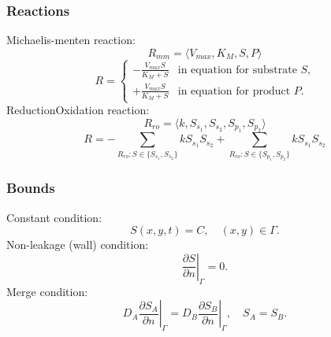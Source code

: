 \documentclass[a4paper,10pt]{article}
\begin{document}
\subsubsection{Reactions}

Michaelis-menten reaction:
\begin{equation}
    R_{mm} = \langle V_{max}, K_M, S, P \rangle
\end{equation}
\begin{equation}
    R = \begin{cases}
            -\frac{V_{max} S}{K_M + S} & \text{in equation for substrate $S$,}
            \\
            +\frac{V_{max} S}{K_M + S} & \text{in equation for product $P$.}
        \end{cases}
\end{equation}
%
ReductionOxidation reaction:
\begin{equation}
    R_{ro} = \langle k, S_{s_1}, S_{s_2}, S_{p_1}, S_{p_2} \rangle
\end{equation}
\begin{equation}
    R =
        - \sum_{R_{ro} : S \in \{S_{s_1}, S_{s_2}\}} k S_{s_1} S_{s_2}
        + \sum_{R_{ro} : S \in \{S_{p_1}, S_{p_2}\}} k S_{s_1} S_{s_2}
\end{equation}



\subsubsection{Bounds}
Constant condition:
\begin{equation}
    S(x, y, t) = C,\quad (x, y) \in \Gamma.
\end{equation}
Non-leakage (wall) condition:
\begin{equation}
    \left.\frac{\partial S}{\partial n}\right|_{\Gamma} = 0.
\end{equation}
Merge condition:
\begin{equation}
    D_A \left.\frac{\partial S_A}{\partial n}\right|_{\Gamma} =
    D_B \left.\frac{\partial S_B}{\partial n}\right|_{\Gamma},
    \quad
    S_A = S_B.
\end{equation}





\end{document}
